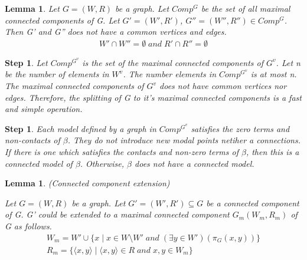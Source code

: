 \documentclass{article}
\newtheorem{lemma}[theorem]{Lemma}
\newtheorem{step}[theorem]{Step}
\newcommand{\pair}[2]{ \langle #1, #2 \rangle }
\newcommand{\pairXY}{ \pair{x}{y} }
\begin{document}
	\begin{lemma}
		Let $G=(W, R)$ be a graph. Let $Comp^G$ be the set of all maximal connected components of G. Let $G'=(W', R')$, $G''=(W'', R'') \in Comp^G$. Then G' and G'' does not have a common vertices and edges.
		\begin{gather*}
			 W' \cap W'' = \emptyset \; and \; R' \cap R'' = \emptyset
		\end{gather*}
	\end{lemma}

	\begin{step}
		Let $Comp^{G^v}$ is the set of the maximal connected components of $G^v$. Let n be the number of elements in $W^v$. The number elements in $Comp^{G^v}$ is at most n. The maximal connected components of $G^v$ does not have common vertices nor edges. Therefore, the splitting of G to it's maximal connected components is a fast and simple operation.
	\end{step}

	\begin{step}
		Each model defined by a graph in $Comp^{G^v}$ satisfies the zero terms and non-contacts of $\beta$. They do not introduce new modal points netiher a connections. If there is one which satisfies the contacts and non-zero terms of $\beta$, then this is a connected model of $\beta$. Otherwise, $\beta$ does not have a connected model.
	\end{step}

	\begin{lemma}(Connected component extension)\label{connected-component-extension}

		Let $G=(W, R)$ be a graph. Let $G'=(W', R') \subseteq G$ be a connected component of G.
		G' could be extended to a maximal connected component $G_m(W_m, R_m)$  of G as follows.
		\label{connected-component-extension}\begin{gather*}
			 W_m = W' \cup \{ x \mid x \in W \setminus W' \; and \; (\exists y \in W')(\pi_G(x,y)) \} \\
			 R_m = \{ \pairXY \mid \pairXY \in R \; and \; x, y \in W_m \}
		\end{gather*}
	\end{lemma}
\end{document}
